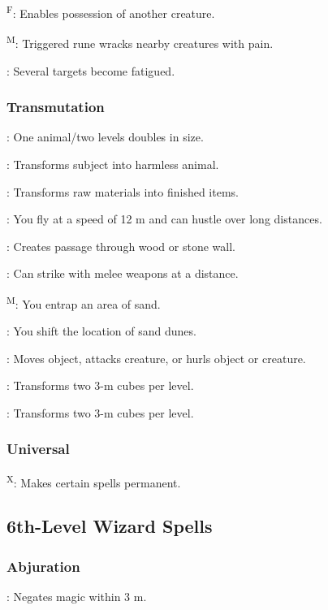	\textsuperscript{F}: Enables possession of another creature.

	\textsuperscript{M}: Triggered rune wracks nearby creatures with pain.

	: Several targets become fatigued.

\subsubsection{Transmutation}
	: One animal/two levels doubles in size.
	
	: Transforms subject into harmless animal.
	
	: Transforms raw materials into finished items.
	
	: You fly at a speed of 12 m and can hustle over long distances.
	
	: Creates passage through wood or stone wall.
	
	: Can strike with melee weapons at a distance. %
	
	\textsuperscript{M}: You entrap an area of sand. %
	
	: You shift the location of sand dunes. %
	
	: Moves object, attacks creature, or hurls object or creature.
	
	: Transforms two 3-m cubes per level.
	
	: Transforms two 3-m cubes per level.

\subsubsection{Universal}
	\textsuperscript{X}: Makes certain spells permanent.



\subsection{6th-Level Wizard Spells}

\subsubsection{Abjuration}
	: Negates magic within 3 m.

